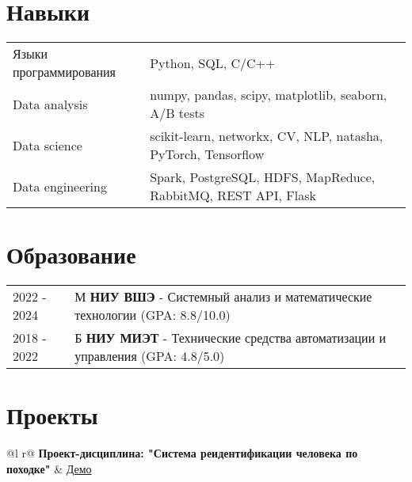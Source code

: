 \documentclass[a4paper,12pt]{article}
\begin{document}

\section{Навыки}
\begin{tabularx}{\linewidth}{@{}l X@{}}
Языки программирования &  \normalsize{Python, SQL, C/C++}\\
Data analysis  &  \normalsize{numpy, pandas, scipy, matplotlib, seaborn, A/B tests}\\ 
Data science  &  \normalsize{scikit-learn, networkx, CV, NLP, natasha, PyTorch, Tensorflow}\\ 
Data engineering  &  \normalsize{Spark, PostgreSQL, HDFS, MapReduce, RabbitMQ, REST API, Flask}\\  

\end{tabularx}



\section{Образование}
\begin{tabularx}{\linewidth}{@{}l X@{}}	
2022 - 2024 & М \textbf{НИУ ВШЭ} - Системный анализ и математические технологии \hfill \normalsize (GPA: 8.8/10.0) \\

2018 - 2022 & Б  \textbf{ НИУ МИЭТ} - Технические средства автоматизации и управления \hfill \normalsize (GPA: 4.8/5.0) \\ 

\end{tabularx}


\section{Проекты}

\begin{tabularx}{\linewidth}{ @{}l r@{} }
\textbf{Проект-дисциплина: "Система реидентификации человека по походке"} & \hfill \href{https://drive.google.com/file/d/1IwEmdHyyXWQlCG_Hfhxn1D-F65usrVAS/view?usp=sharing}{Демо} \\[3.75pt]
  \\
\end{tabularx}
\end{document}
